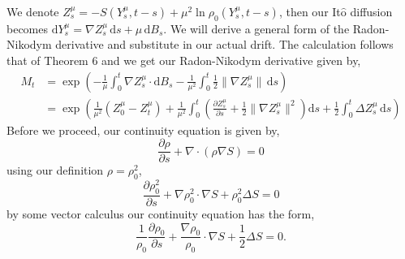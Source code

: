 \documentclass[a4paper,12pt,draft]{report}
\begin{document}
{
We denote $Z_s^\mu = -S(Y_s^\mu, t - s) + \mu^2\ln\rho_0(Y_s^\mu, t - s)$, then our It$\mathrm{\hat{o}}$ diffusion becomes $\mathrm{d}Y_s^\mu = \nabla Z_s^\mu\,\mathrm{d}s + \mu\,\mathrm{d}B_s$.  We will derive a general form of the Radon-Nikodym derivative and substitute in our actual drift.  The calculation follows that of Theorem 6 and we get our Radon-Nikodym derivative given by,
\begin{align}
M_t & = \exp\left(-\frac{1}{\mu}\int_0^t\nabla Z_s^\mu\cdot\mathrm{d}B_s - \frac{1}{\mu^2}\int_0^t\frac{1}{2}\|\nabla Z_s^\mu\|\,\mathrm{d}s\right)\nonumber\\
& = \exp\left(\frac{1}{\mu^2}(Z_0^\mu - Z_t^\mu) + \frac{1}{\mu^2}\int_0^t\left(\frac{\partial Z_s^\mu}{\partial s} + \frac{1}{2}\|\nabla Z_s^\mu\|^2\right)\mathrm{d}s + \frac{1}{2}\int_0^t\Delta Z_s^\mu\,\mathrm{d}s\right)\nonumber
\end{align}
Before we proceed, our continuity equation is given by,
$$
\frac{\partial \rho}{\partial s} + \nabla\cdot(\rho\nabla S) = 0
$$
using our definition $\rho = \rho_0^2$,
$$
\frac{\partial \rho_0^2}{\partial s} + \nabla\rho_0^2\cdot\nabla S + \rho_0^2\Delta S = 0
$$
by some vector calculus our continuity equation has the form,
$$
\frac{1}{\rho_0}\frac{\partial\rho_0}{\partial s} + \frac{\nabla\rho_0}{\rho_0}\cdot\nabla S + \frac{1}{2}\Delta S = 0.
$$

}
\end{document}
